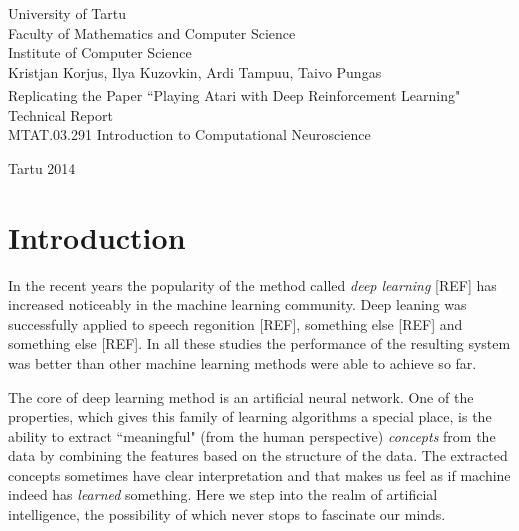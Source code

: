 \documentclass[a4paper,12pt]{article}
\begin{document}
\begin{center}
	{\Large
	University of Tartu\\
	Faculty of Mathematics and Computer Science\\
	Institute of Computer Science\\}
	\vspace{6cm}
	{\Large Kristjan Korjus, Ilya Kuzovkin, Ardi Tampuu, Taivo Pungas}\\
	\vspace{1.0cm}
	{\Huge Replicating the Paper ``Playing Atari with Deep Reinforcement Learning"\textsuperscript{\Large{\cite{mnih2013playing}}}}\\
	\vspace{0.5cm}
	{\Large Technical Report}\\
	\vspace{1.0cm}
	{\large MTAT.03.291 Introduction to Computational Neuroscience}
	
\end{center}
\vspace{9cm}
\begin{center}
	{\large Tartu 2014}
\end{center}
\thispagestyle{empty}
\pagebreak



%
%
\thispagestyle{empty}
\tableofcontents
\pagebreak



%
%
\section*{Introduction}
In the recent years the popularity of the method called \emph{deep learning} [REF] has increased noticeably in the machine learning community. Deep leaning was successfully applied to speech regonition [REF], something else [REF] and something else [REF]. In all these studies the performance of the resulting system was better than other machine learning methods were able to achieve so far.

The core of deep learning method is an artificial neural network. One of the properties, which gives this family of learning algorithms a special place, is the ability to extract ``meaningful" (from the human perspective) \emph{concepts} from the data by combining the features based on the structure of the data. The extracted concepts sometimes have clear interpretation and that makes us feel as if machine indeed has \emph{learned} something. Here we step into the realm of artificial intelligence, the possibility of which never stops to fascinate our minds.
\end{document}
